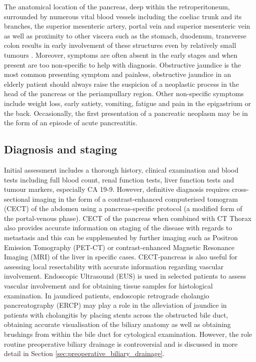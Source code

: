 The anatomical location of the pancreas, deep within the retroperitoneum, surrounded by numerous vital blood vessels including the coeliac trunk and its branches, the superior mesenteric artery, portal vein and superior mesenteric vein as well as proximity to other viscera such as the stomach, duodenum, transverse colon results in early involvement of these structures even by relatively small tumours \parencite{li_pancreatic_2004}. 
Moreover, symptoms are often absent in the early stages and when present are too non-specific to help with diagnosis. 
Obstructive jaundice is the most common presenting symptom and painless, obstructive jaundice in an elderly patient should always raise the suspicion of a neoplastic process in the head of the pancreas or the periampullary region. 
Other non-specific symptoms include weight loss, early satiety, vomiting, fatigue and pain in the epigastrium or the back. 
Occasionally, the first presentation of a pancreatic neoplasm may be in the form of an episode of acute pancreatitis.
 
\subsection{Diagnosis and staging}

Initial assessment includes a thorough history, clinical examination and blood tests including full blood count, renal function tests, liver function tests and tumour markers, especially CA 19-9. 
However, definitive diagnosis requires cross-sectional imaging in the form of a contrast-enhanced computerised tomogram (CECT) of the abdomen using a pancreas-specific protocol (a modified form of the portal-venous phase). 
CECT of the pancreas when combined with CT Thorax also provides accurate information on staging of the disease with regards to metastasis and this can be supplemented by further imaging such as Positron Emission Tomography (PET-CT) or contrast-enhanced Magnetic Resonance Imaging (MRI) of the liver in specific cases. 
CECT-pancreas is also useful for assessing local resectability with accurate information regarding vascular involvement. 
Endoscopic Ultrasound (EUS) is used in selected patients to assess vascular involvement and for obtaining tissue samples for histological examination. 
In jaundiced patients, endoscopic retrograde cholangio pancreatography (ERCP) may play a role in the alleviation of jaundice in patients with cholangitis by placing stents across the obstructed bile duct, obtaining accurate visualisation of the biliary anatomy as well as obtaining brushings from within the bile duct for cytological examination. 
However, the role routine preoperative biliary drainage is controversial and is discussed in more detail in Section \ref{sec:preoperative_biliary_drainage}.
	
